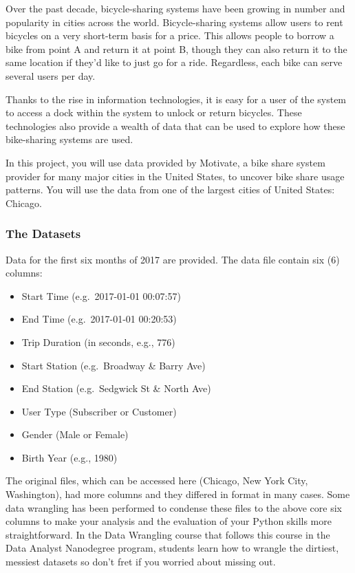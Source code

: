 \documentclass[]{book}
\providecommand{\tightlist}{%
  \setlength{\itemsep}{0pt}\setlength{\parskip}{0pt}}
\begin{document}
Over the past decade, bicycle-sharing systems have been growing in
number and popularity in cities across the world. Bicycle-sharing
systems allow users to rent bicycles on a very short-term basis for a
price. This allows people to borrow a bike from point A and return it at
point B, though they can also return it to the same location if they'd
like to just go for a ride. Regardless, each bike can serve several
users per day.

Thanks to the rise in information technologies, it is easy for a user of
the system to access a dock within the system to unlock or return
bicycles. These technologies also provide a wealth of data that can be
used to explore how these bike-sharing systems are used.

In this project, you will use data provided by Motivate, a bike share
system provider for many major cities in the United States, to uncover
bike share usage patterns. You will use the data from one of the largest
cities of United States: Chicago.

\subsubsection{The Datasets}\label{the-datasets}

Data for the first six months of 2017 are provided. The data file
contain six (6) columns:

\begin{itemize}
\tightlist
\item
  Start Time (e.g.~2017-01-01 00:07:57)
\item
  End Time (e.g.~2017-01-01 00:20:53)
\item
  Trip Duration (in seconds, e.g., 776)
\item
  Start Station (e.g.~Broadway \& Barry Ave)
\item
  End Station (e.g.~Sedgwick St \& North Ave)
\item
  User Type (Subscriber or Customer)
\item
  Gender (Male or Female)
\item
  Birth Year (e.g., 1980)
\end{itemize}

The original files, which can be accessed here (Chicago, New York City,
Washington), had more columns and they differed in format in many cases.
Some data wrangling has been performed to condense these files to the
above core six columns to make your analysis and the evaluation of your
Python skills more straightforward. In the Data Wrangling course that
follows this course in the Data Analyst Nanodegree program, students
learn how to wrangle the dirtiest, messiest datasets so don't fret if
you worried about missing out.
\end{document}
